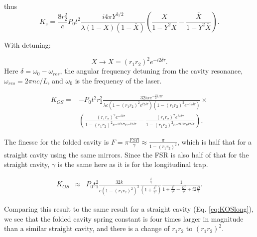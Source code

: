 thus 
\begin{equation}
K_z=\frac{8r_2^2}{c} P_0 t^2 \frac{i 4\pi Y^{3/2}}{\lambda(1-X)(1-\overline{X})}\left(\frac{X}{1-Y^2X}-\frac{\overline{X}}{1-Y^2\overline{X}}\right).
\label{eq:Kz}
\end{equation}

With detuning:

\begin{equation}
X \rightarrow X=(r_1r_2)^2 e^{-i2\delta\tau}.
\label{e:Xdet}
\end{equation}
Here $\delta = \omega_0-\omega_{res}$, the angular frequency detuning from the cavity resonance, $\omega_{res} = 2\pi n c/L$, and $\omega_0$ is the frequency of the laser.

\begin{eqnarray}
K_{OS}=&-P_0 t^2 r_2^2 \frac{32i\pi e^{-\frac{3}{2}i\Omega\tau}}{\lambda c(1-(r_1r_2)^2e^{i2\delta\tau})(1-(r_1r_2)^2e^{-i2\delta\tau})}\times\nonumber\\
 & \left( \frac{(r_1r_2)^2e^{-i\delta \tau}}{1-(r_1r_2)^2e^{-2i\Omega\tau} e^{-i2\delta\tau}}
 -\frac{(r_1r_2)^2e^{i2\delta\tau}}{1-(r_1r_2)^2e^{-2i\Omega\tau}e^{i2\delta\tau}} \right). 
\end{eqnarray}

The finesse for the folded cavity is $F = \pi\frac{FSR}{\gamma} \approx \frac{\pi}{1-(r_1r_2)^2}$, which is half that for a straight cavity using the same mirrors. Since the FSR is also half of that for the straight cavity, $\gamma$ is the same here as it is for the longitudinal trap.

\begin{eqnarray}
\label{eq:KOSfold}
K_{OS} & {\approx} & P_0 t_1^2 \frac{32k}{c(1-(r_1r_2)^2)^3}\frac{ \frac{\delta}{\gamma}}{(1+\frac{\delta^2}{\gamma^2})} 
\frac{1}{1+\frac{\delta^2}{\gamma^2}-\frac{\Omega^2}{\gamma^2}+i2\frac{\Omega}{\gamma} }.
\end{eqnarray}

Comparing this result to the same result for a straight cavity (Eq. \ref{eq:KOSlong}), we see that the folded cavity spring constant is four times larger in magnitude than a similar straight cavity, and there is a change of $r_1r_2$ to $(r_1r_2)^2$.
